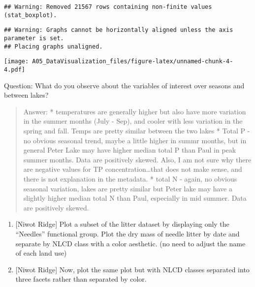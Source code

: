 \documentclass[
]{article}
\newenvironment{Shaded}{\begin{snugshade}}{\end{snugshade}}
\newcommand{\CommentTok}[1]{\textcolor[rgb]{0.56,0.35,0.01}{\textit{#1}}}
\newcommand{\KeywordTok}[1]{\textcolor[rgb]{0.13,0.29,0.53}{\textbf{#1}}}
\newcommand{\NormalTok}[1]{#1}
\newcommand{\OperatorTok}[1]{\textcolor[rgb]{0.81,0.36,0.00}{\textbf{#1}}}
\begin{document}
\begin{verbatim}
## Warning: Removed 21567 rows containing non-finite values (stat_boxplot).
\end{verbatim}

\begin{verbatim}
## Warning: Graphs cannot be horizontally aligned unless the axis parameter is set.
## Placing graphs unaligned.
\end{verbatim}

\texttt{[image: A05\_DataVisualization\_files/figure-latex/unnamed-chunk-4-4.pdf]}

Question: What do you observe about the variables of interest over
seasons and between lakes?

\begin{quote}
Answer: * temperatures are generally higher but also have more variation
in the summer months (July - Sep), and cooler with less variation in the
spring and fall. Temps are pretty similar between the two lakes * Total
P - no obvious seasonal trend, maybe a little higher in summr months,
but in general Peter Lake may have higher median total P than Paul in
peak summer months. Data are positively skewed. Also, I am not sure why
there are negative values for TP concentration\ldots that does not make
sense, and there is not explanation in the metadata. * total N - again,
no obvious seasonal variation, lakes are pretty similar but Peter lake
may have a slightly higher median total N than Paul, especially in mid
summer. Data are positively skewed.
\end{quote}

\begin{enumerate}
\def\labelenumi{\arabic{enumi}.}
\setcounter{enumi}{5}
\item
  {[}Niwot Ridge{]} Plot a subset of the litter dataset by displaying
  only the ``Needles'' functional group. Plot the dry mass of needle
  litter by date and separate by NLCD class with a color aesthetic. (no
  need to adjust the name of each land use)
\item
  {[}Niwot Ridge{]} Now, plot the same plot but with NLCD classes
  separated into three facets rather than separated by color.
\end{enumerate}

\begin{Shaded}
\end{Shaded}
\end{document}
